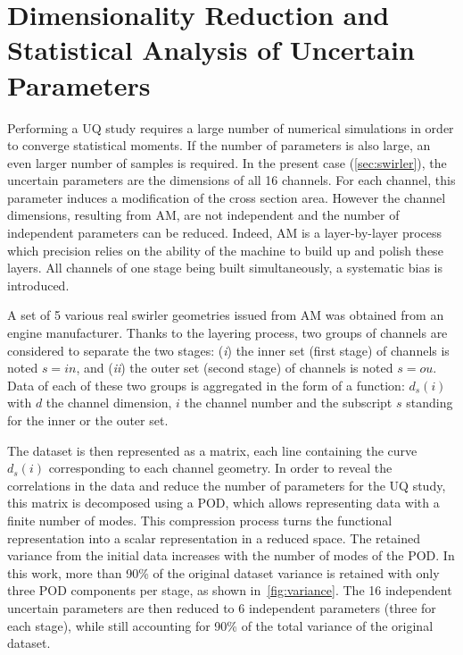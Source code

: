 \section{Dimensionality Reduction and Statistical Analysis of Uncertain Parameters}\label{sec:dim}
Performing a UQ study requires a large number of numerical simulations in order to converge statistical moments. If the number of parameters is also large, an even larger number of samples is required. In the present case (\cref{sec:swirler}), the uncertain parameters are the dimensions of all 16 channels. For each channel, this parameter induces a modification of the cross section area. However the channel dimensions, resulting from AM, are not independent and the number of independent parameters can be reduced. Indeed, AM is a layer-by-layer process which precision relies on the ability of the machine to build up and polish these layers. All channels of one stage being built simultaneously, a systematic bias is introduced. 

A set of 5 various real swirler geometries issued from AM was obtained from an engine manufacturer. Thanks to the layering process, two groups of channels are considered to separate the two stages: (\emph{i}) the inner set (first stage) of channels is noted $s=in$, and (\emph{ii}) the outer set (second stage) of channels is noted $s=ou$. Data of each of these two groups is aggregated in the form of a function: $d_{s}(i)$ with $d$ the channel dimension, $i$ the channel number and the subscript $s$ standing for the inner or the outer set. 

The dataset is then represented as a matrix, each line containing the curve $d_{s}(i)$ corresponding to each channel geometry. In order to reveal the correlations in the data and reduce the number of parameters for the UQ study, this matrix is decomposed using a POD, which allows representing data with a finite number of modes. This compression process turns the functional representation into a scalar representation in a reduced space. The retained variance from the initial data increases with the number of modes of the POD. In this work, more than 90\% of the original dataset variance is retained with only three POD components per stage, as shown in~\cref{fig:variance}. The 16 independent uncertain parameters are then reduced to 6 independent parameters (three for each stage), while still accounting for 90\% of the total variance of the original dataset. 

